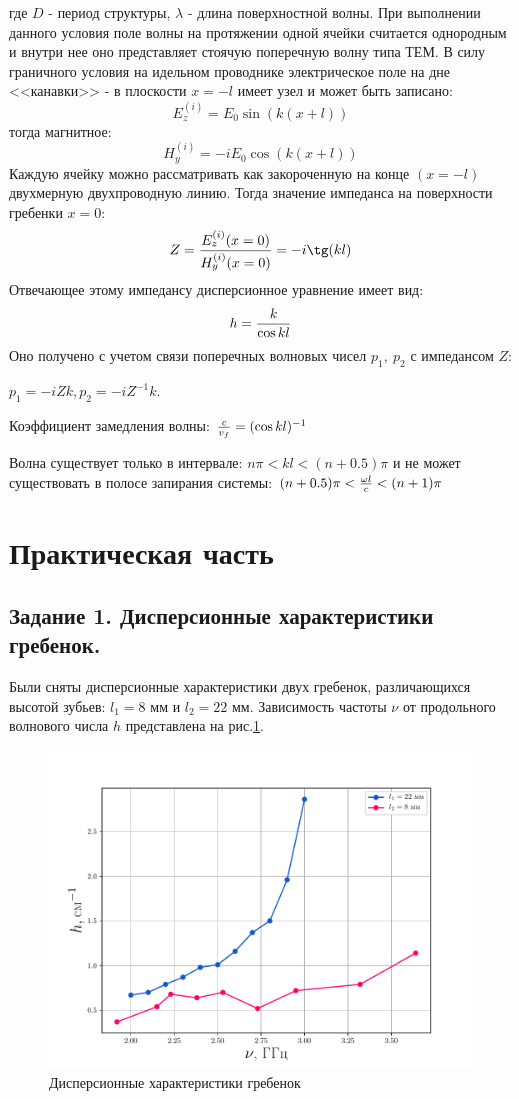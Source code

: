 где $D$ - период структуры, $\lambda$ - длина поверхностной волны. При выполнении данного условия поле волны на протяжении одной ячейки считается однородным и внутри нее оно представляет стоячую поперечную волну типа ТЕМ. В силу граничного условия на идельном проводнике электрическое поле на дне <<канавки>> - в плоскости $x=-l$ имеет узел и может быть записано:
\begin{equation}
    E_z^{(i)}=E_0\sin(k(x+l))
\end{equation}
тогда магнитное:
\begin{equation}
    H_y^{(i)}=-iE_0\cos(k(x+l))
\end{equation}
Каждую ячейку можно рассматривать как закороченную на конце $(x=-l)$ двухмерную двухпроводную линию. Тогда значение импеданса на поверхности гребенки $x=0$:
$$Z={{E_z^{(i)}(x=0)}\over{H_y^{(i)}(x=0)}}=-i\tg(kl)$$
Отвечающее этому импедансу дисперсионное уравнение имеет вид:
$$h={{k}\over{\cos kl}}$$
Оно получено с учетом связи поперечных волновых чисел $p_1,~ p_2$ с импедансом $Z$:

 $p_1 = -iZk, p_2 = -iZ^{-1}k$.


Коэффициент замедления волны: ${{c}\over{v_f}}=(\cos kl)^{-1}$


Волна существует только в интервале: $n\pi <kl<(n+0.5)\pi$
и не может существовать в полосе запирания системы: $(n+0.5)\pi <{{\omega l}\over{c}}<(n+1)\pi$




\section{Практическая часть} %
\subsection*{Задание 1. Дисперсионные характеристики гребенок.} %
Были сняты дисперсионные характеристики двух гребенок, различающихся высотой зубьев: $l_1 = 8$ мм и $l_2 = 22 $ мм.
Зависимость частоты  $\nu$ от продольного волнового числа  $h$ представлена на рис.\ref{fig:1}.
\begin{figure}[h!]
\centering
\includegraphics[width=0.9\linewidth]{rec/task1.pdf}
\caption{Дисперсионные характеристики гребенок}
\label{fig:1}
\end{figure}

